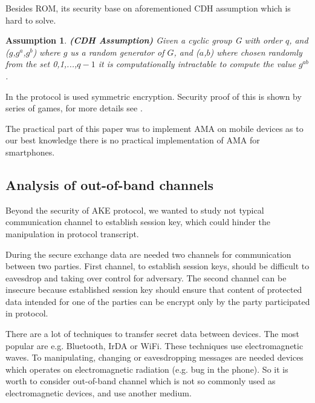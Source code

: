 \documentclass[11pt,titlepage]{article}
\theoremstyle{plain}
\newtheorem{assumption}{Assumption}
\begin{document}
\vspace{5mm}

Besides ROM, its security base on aforementioned CDH assumption which is hard to solve.
\begin{assumption}
	\textbf{(CDH Assumption)} 
	Given a cyclic group G with order $q$, and ($g$,$g^a$,$g^b$) where $g$ us a random generator of $G$, and ($a$,$b$) where chosen randomly from the set {0,1,...,$q-1$} it is computationally intractable to compute the value $g^{ab}$.
\end{assumption}
 In the protocol is used symmetric encryption. Security proof of this is shown by series of games, for more details see \cite{AMA}. 

\vspace{5mm}

The practical part of this paper was to implement AMA on mobile devices as to our best knowledge there is no practical implementation of AMA for smartphones.




\subsection{Analysis of out-of-band channels}
Beyond the security of AKE protocol, we wanted to study not typical communication channel to establish session key, which could hinder the manipulation in protocol transcript.

\vspace{5mm}

During the secure exchange data are needed two channels for communication between two parties. First channel, to establish session keys, should be difficult to eavesdrop and taking over control for adversary. The second channel can be insecure because established session key should ensure that content of protected data intended for one of the parties can be encrypt only by the party participated in protocol. 


There are a lot of techniques to transfer secret data between devices. The most popular are e.g. Bluetooth, IrDA or WiFi. These techniques use electromagnetic waves. To manipulating, changing or eavesdropping messages are needed devices which operates on electromagnetic radiation (e.g. bug in the phone). So it is worth to consider out-of-band channel which is not so commonly used as electromagnetic devices, and use another medium.
\end{document}
